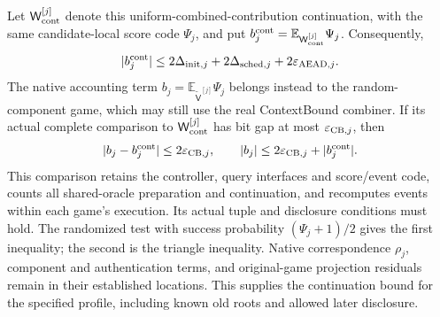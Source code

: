 Let $\mathsf W_{\rm cont}^{[j]}$ denote this uniform-combined-contribution
continuation, with the same candidate-local score code $\Psi_j$, and put
$b_j^{\rm cont}=\mathbb E_{\mathsf W_{\rm cont}^{[j]}}\Psi_j$.
Consequently,
\[
 |b_j^{\rm cont}|\le
 2\Delta_{{\rm init},j}
 +2\Delta_{{\rm sched},j}
 +2\varepsilon_{{\rm AEAD},j}.
\]
The native accounting term
$b_j=\mathbb E_{\widetilde{\mathsf V}^{[j]}}\Psi_j$ belongs instead to
the random-component game, which may still use the real ContextBound
combiner. If its actual complete comparison to
$\mathsf W_{\rm cont}^{[j]}$ has bit gap at most
$\varepsilon_{{\rm CB},j}$, then
\[
 |b_j-b_j^{\rm cont}|\le2\varepsilon_{{\rm CB},j},
 \qquad
 |b_j|\le2\varepsilon_{{\rm CB},j}+|b_j^{\rm cont}|.
\]
This comparison retains the controller, query interfaces and score/event
code, counts all shared-oracle preparation and continuation, and recomputes
events within each game's execution. Its actual tuple and disclosure
conditions must hold. The randomized test with success probability
$(\Psi_j+1)/2$ gives the first inequality; the second is the triangle
inequality. Native correspondence $\rho_j$, component and authentication
terms, and original-game projection residuals remain in their established
locations. This supplies the continuation bound for the specified profile,
including known old roots and allowed later disclosure.

